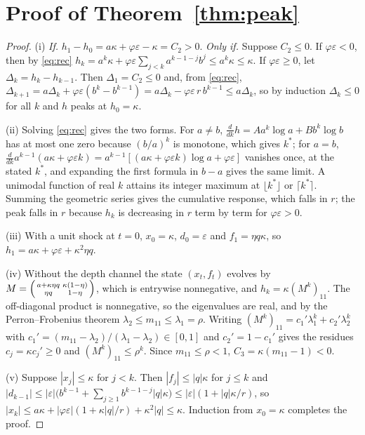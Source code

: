 \documentclass[12pt]{article}
\theoremstyle{definition}
\theoremstyle{remark}
\begin{document}
\section{Proof of Theorem~\ref{thm:peak}}
\begin{proof}
(i) \emph{If.} $h_1-h_0=a\kappa+\varphi\varepsilon-\kappa=C_2>0$. \emph{Only if.} Suppose $C_2\le0$. If $\varphi\varepsilon<0$, then by \eqref{eq:rec} $h_k=a^k\kappa+\varphi\varepsilon\sum_{j<k}a^{k-1-j}b^j\le a^k\kappa\le\kappa$. If $\varphi\varepsilon\ge0$, let $\Delta_k=h_k-h_{k-1}$. Then $\Delta_1=C_2\le0$ and, from \eqref{eq:rec}, $\Delta_{k+1}=a\Delta_k+\varphi\varepsilon(b^{k}-b^{k-1})=a\Delta_k-\varphi\varepsilon\,r\,b^{k-1}\le a\Delta_k$, so by induction $\Delta_k\le0$ for all $k$ and $h$ peaks at $h_0=\kappa$.

(ii) Solving \eqref{eq:rec} gives the two forms. For $a\ne b$, $\frac{d}{dk}h=Aa^k\log a+Bb^k\log b$ has at most one zero because $(b/a)^k$ is monotone, which gives $k^*$; for $a=b$, $\frac{d}{dk}a^{k-1}(a\kappa+\varphi\varepsilon k)=a^{k-1}[(a\kappa+\varphi\varepsilon k)\log a+\varphi\varepsilon]$ vanishes once, at the stated $k^*$, and expanding the first formula in $b-a$ gives the same limit. A unimodal function of real $k$ attains its integer maximum at $\lfloor k^*\rfloor$ or $\lceil k^*\rceil$. Summing the geometric series gives the cumulative response, which falls in $r$; the peak falls in $r$ because $h_k$ is decreasing in $r$ term by term for $\varphi\varepsilon>0$.

(iii) With a unit shock at $t=0$, $x_0=\kappa$, $d_0=\varepsilon$ and $f_1=\eta q\kappa$, so $h_1=a\kappa+\varphi\varepsilon+\kappa^2\eta q$.

(iv) Without the depth channel the state $(x_t,f_t)$ evolves by $M=\begin{psmallmatrix}a+\kappa\eta q&\kappa(1-\eta)\\ \eta q&1-\eta\end{psmallmatrix}$, which is entrywise nonnegative, and $h_k=\kappa(M^k)_{11}$. The off-diagonal product is nonnegative, so the eigenvalues are real, and by the Perron--Frobenius theorem $\lambda_2\le m_{11}\le\lambda_1=\rho$. Writing $(M^k)_{11}=c_1'\lambda_1^k+c_2'\lambda_2^k$ with $c_1'=(m_{11}-\lambda_2)/(\lambda_1-\lambda_2)\in[0,1]$ and $c_2'=1-c_1'$ gives the residues $c_j=\kappa c_j'\ge0$ and $(M^k)_{11}\le\rho^k$. Since $m_{11}\le\rho<1$, $C_3=\kappa(m_{11}-1)<0$.

(v) Suppose $|x_j|\le\kappa$ for $j<k$. Then $|f_j|\le|q|\kappa$ for $j\le k$ and $|d_{k-1}|\le|\varepsilon|\bigl(b^{k-1}+\sum_{j\ge1}b^{k-1-j}|q|\kappa\bigr)\le|\varepsilon|(1+|q|\kappa/r)$, so $|x_k|\le a\kappa+|\varphi\varepsilon|(1+\kappa|q|/r)+\kappa^2|q|\le\kappa$. Induction from $x_0=\kappa$ completes the proof.
\end{proof}
\end{document}
